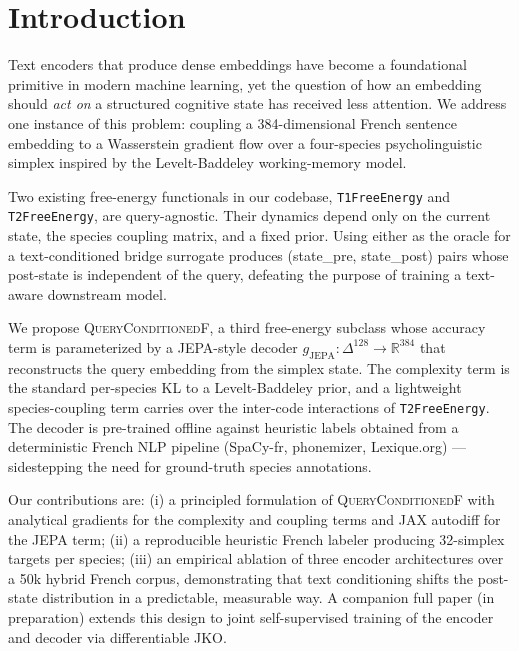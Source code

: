 \section{Introduction}
\label{sec:intro}

Text encoders that produce dense embeddings have become a foundational primitive in modern machine learning, yet the question of how an embedding should \emph{act on} a structured cognitive state has received less attention. We address one instance of this problem: coupling a 384-dimensional French sentence embedding to a Wasserstein gradient flow over a four-species psycholinguistic simplex inspired by the Levelt-Baddeley working-memory model.

Two existing free-energy functionals in our codebase, \texttt{T1FreeEnergy} and \texttt{T2FreeEnergy}, are query-agnostic. Their dynamics depend only on the current state, the species coupling matrix, and a fixed prior. Using either as the oracle for a text-conditioned bridge surrogate produces (state\_pre, state\_post) pairs whose post-state is independent of the query, defeating the purpose of training a text-aware downstream model.

We propose \textsc{QueryConditionedF}, a third free-energy subclass whose accuracy term is parameterized by a JEPA-style decoder \( g_{\mathrm{JEPA}}: \Delta^{128} \to \mathbb{R}^{384} \) that reconstructs the query embedding from the simplex state. The complexity term is the standard per-species KL to a Levelt-Baddeley prior, and a lightweight species-coupling term carries over the inter-code interactions of \texttt{T2FreeEnergy}. The decoder is pre-trained offline against heuristic labels obtained from a deterministic French NLP pipeline (SpaCy-fr, phonemizer, Lexique.org) --- sidestepping the need for ground-truth species annotations.

Our contributions are: (i) a principled formulation of \textsc{QueryConditionedF} with analytical gradients for the complexity and coupling terms and JAX autodiff for the JEPA term; (ii) a reproducible heuristic French labeler producing 32-simplex targets per species; (iii) an empirical ablation of three encoder architectures over a 50k hybrid French corpus, demonstrating that text conditioning shifts the post-state distribution in a predictable, measurable way. A companion full paper (in preparation) extends this design to joint self-supervised training of the encoder and decoder via differentiable JKO.
